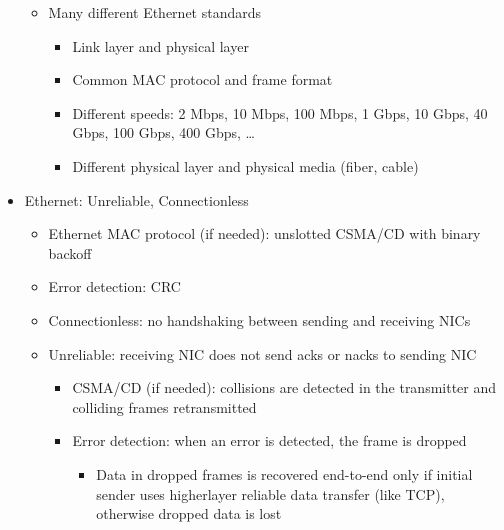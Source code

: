 \begin{itemize}
\begin{itemize}
      \item Many different Ethernet standards

        \begin{itemize}

          \item Link layer and physical layer

          \item Common MAC protocol and frame format

          \item Different speeds: 2 Mbps, 10 Mbps, 100 Mbps, 1 Gbps, 10 Gbps, 40 Gbps, 100 Gbps, 400 Gbps, \ldots

          \item Different physical layer and physical media (fiber, cable)

        \end{itemize}

    \end{itemize}

  \item Ethernet: Unreliable, Connectionless

    \begin{itemize}

      \item Ethernet MAC protocol (if needed): unslotted CSMA/CD with binary backoff

      \item Error detection: CRC

      \item Connectionless: no handshaking between sending and receiving NICs

      \item Unreliable: receiving NIC does not send acks or nacks to sending NIC

        \begin{itemize}

          \item CSMA/CD (if needed): collisions are detected in the transmitter and colliding frames retransmitted

          \item Error detection: when an error is detected, the frame is dropped

            \begin{itemize}

              \item Data in dropped frames is recovered end-to-end only if initial sender uses higherlayer reliable data transfer (like TCP), otherwise dropped data is lost


\end{itemize}
\end{itemize}
\end{itemize}
\end{itemize}
